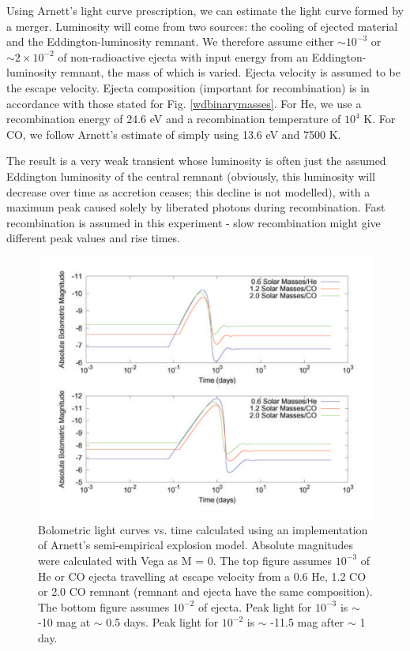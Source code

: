 Using Arnett's light curve prescription, we can estimate the light curve formed by a merger.  Luminosity will come from two sources: the cooling of ejected material and the Eddington-luminosity remnant.  We therefore assume either $\sim 10^{-3}$ {\Msun} or $\sim 2 \times 10^{-2}$ {\Msun} of non-radioactive ejecta with input energy from an Eddington-luminosity remnant, the mass of which is varied.  Ejecta velocity is assumed to be the escape velocity.  Ejecta composition (important for recombination) is in accordance with those stated for Fig. \ref{wdbinarymasses}.  For He, we use a recombination energy of 24.6 eV and a recombination temperature of $10^4$ K.  For CO, we follow Arnett's estimate of simply using 13.6 eV and 7500 K.

The result is a very weak transient whose luminosity is often just the assumed Eddington luminosity of the central remnant (obviously, this luminosity will decrease over time as accretion ceases; this decline is not modelled), with a maximum peak caused solely by liberated photons during recombination.  Fast recombination is assumed in this experiment - slow recombination might give different peak values and rise times.

\begin{figure}
\centerline{\includegraphics[width=1.0\hsize]{pathetictransient.pdf}}
\caption{Bolometric light curves vs. time calculated using an implementation of Arnett's semi-empirical explosion model.  Absolute magnitudes were calculated with Vega as M = 0.  The top figure assumes $10^{-3}$ {\Msun} of He or CO ejecta travelling at escape velocity from a 0.6 {\Msun} He, 1.2 {\Msun} CO or 2.0 {\Msun} CO remnant (remnant and ejecta have the same composition).  The bottom figure assumes $10^{-2}$ {\Msun} of ejecta.  Peak light for $10^{-3}$ {\Msun} is $\sim$ -10 mag at $\sim$ 0.5 days.  Peak light for $10^{-2}$ {\Msun} is $\sim$ -11.5 mag after $\sim$ 1 day.}
\label{pathetictransient}
\end{figure}

